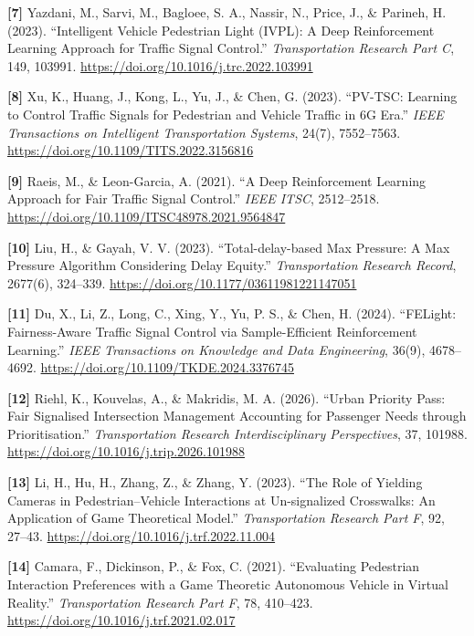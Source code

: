 \documentclass[
  english,
  11pt,
  a4paper,
]{article}
\begin{document}
\protect{}\label{source-7}{} \textbf{{[}7{]}} Yazdani, M.,
Sarvi, M., Bagloee, S. A., Nassir, N., Price, J., \& Parineh, H. (2023).
``Intelligent Vehicle Pedestrian Light (IVPL): A Deep Reinforcement
Learning Approach for Traffic Signal Control.'' \emph{Transportation
Research Part C}, 149, 103991.
\url{https://doi.org/10.1016/j.trc.2022.103991}

\protect{}\label{source-8}{} \textbf{{[}8{]}} Xu, K.,
Huang, J., Kong, L., Yu, J., \& Chen, G. (2023). ``PV-TSC: Learning to
Control Traffic Signals for Pedestrian and Vehicle Traffic in 6G Era.''
\emph{IEEE Transactions on Intelligent Transportation Systems}, 24(7),
7552--7563. \url{https://doi.org/10.1109/TITS.2022.3156816}

\protect{}\label{source-9}{} \textbf{{[}9{]}} Raeis, M., \&
Leon-Garcia, A. (2021). ``A Deep Reinforcement Learning Approach for
Fair Traffic Signal Control.'' \emph{IEEE ITSC}, 2512--2518.
\url{https://doi.org/10.1109/ITSC48978.2021.9564847}

\protect{}\label{source-10}{} \textbf{{[}10{]}} Liu, H., \&
Gayah, V. V. (2023). ``Total-delay-based Max Pressure: A Max Pressure
Algorithm Considering Delay Equity.'' \emph{Transportation Research
Record}, 2677(6), 324--339.
\url{https://doi.org/10.1177/03611981221147051}

\protect{}\label{source-11}{} \textbf{{[}11{]}} Du, X., Li,
Z., Long, C., Xing, Y., Yu, P. S., \& Chen, H. (2024). ``FELight:
Fairness-Aware Traffic Signal Control via Sample-Efficient Reinforcement
Learning.'' \emph{IEEE Transactions on Knowledge and Data Engineering},
36(9), 4678--4692. \url{https://doi.org/10.1109/TKDE.2024.3376745}

\protect{}\label{source-12}{} \textbf{{[}12{]}} Riehl, K.,
Kouvelas, A., \& Makridis, M. A. (2026). ``Urban Priority Pass: Fair
Signalised Intersection Management Accounting for Passenger Needs
through Prioritisation.'' \emph{Transportation Research
Interdisciplinary Perspectives}, 37, 101988.
\url{https://doi.org/10.1016/j.trip.2026.101988}

\protect{}\label{source-13}{} \textbf{{[}13{]}} Li, H., Hu,
H., Zhang, Z., \& Zhang, Y. (2023). ``The Role of Yielding Cameras in
Pedestrian--Vehicle Interactions at Un-signalized Crosswalks: An
Application of Game Theoretical Model.'' \emph{Transportation Research
Part F}, 92, 27--43. \url{https://doi.org/10.1016/j.trf.2022.11.004}

\protect{}\label{source-14}{} \textbf{{[}14{]}} Camara, F.,
Dickinson, P., \& Fox, C. (2021). ``Evaluating Pedestrian Interaction
Preferences with a Game Theoretic Autonomous Vehicle in Virtual
Reality.'' \emph{Transportation Research Part F}, 78, 410--423.
\url{https://doi.org/10.1016/j.trf.2021.02.017}
\end{document}
